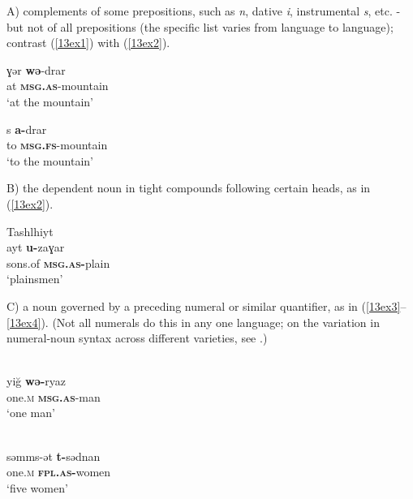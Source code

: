 \documentclass[output=paper,colorlinks,citecolor=brown]{langscibook}
\begin{document}
\medskip

\noindent A) complements of some prepositions, such as  \emph{n}, dative \emph{i}, instrumental \emph{s}, etc. - but not of all prepositions (the specific list varies from language to language); contrast (\ref{13ex1}) with (\ref{13ex2}).

\begin{exe}
	\ex \label{13ex1}  \citep[24]{mettouchifrajzyngier2013}
	\begin{xlist}
		\ex 
		\gll ɣər \textbf{wə}-drar \\
		at \textbf{\textsc{msg.as}}-mountain \\
		\trans ‘at the mountain’
		
		\ex 
		\gll s \textbf{a-}drar \\
		to \textbf{\textsc{msg.fs}}-mountain \\
		\trans ‘to the mountain’
	\end{xlist}
\end{exe}

\noindent B) the dependent noun in tight compounds following certain heads, as in (\ref{13ex2}).

\begin{exe}
	\ex \label{13ex2} Tashlhiyt \citep[116]{elmoujahid1997} \\
	\gll ayt \textbf{u-}zaɣar \\
		sons.of \textbf{\textsc{msg.as-}}plain \\
		\trans ‘plainsmen’
\end{exe}

\noindent C) a noun governed by a preceding numeral or similar quantifier, as in (\ref{13ex3}--\ref{13ex4}). (Not all numerals do this in any one language; on the variation in numeral-noun syntax across different varieties, see \citep[212]{galand2002}.)

\begin{exe}
	\ex \label{13ex3}  \citep[67]{genevois1973} \\
	\gll yiğ \textbf{wə-}ryaz \\
	one.\textsc{m} \textbf{\textsc{msg.as}}-man \\
	\trans ‘one man’
\end{exe}

\begin{exe}
	\ex \label{13ex4}  \citep[95]{abdessalamabdessalam1996} \\
	\gll səmms-ət \textbf{t-}sədnan \\
	one.\textsc{m} \textbf{\textsc{fpl.as-}}women \\
	\trans ‘five women’
\end{exe}
\end{document}
